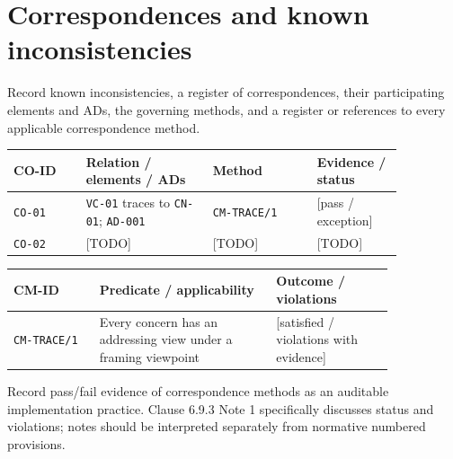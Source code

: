 \documentclass[11pt,letterpaper]{article}
\begin{document}
\section{Correspondences and known inconsistencies \texorpdfstring{}{(6.9)}}
\begin{Requirement}\FlagReq{} Record known inconsistencies, a register of correspondences, their participating elements and ADs, the governing methods, and a register or references to every applicable correspondence method. \end{Requirement}
\begin{longtable}{p{0.16\linewidth}p{0.28\linewidth}p{0.23\linewidth}p{0.19\linewidth}}\toprule
\textbf{CO-ID}&\textbf{Relation / elements / ADs}&\textbf{Method}&\textbf{Evidence / status}\\\midrule\endhead
\texttt{CO-01}&\texttt{VC-01} traces to \texttt{CN-01}; \texttt{AD-001}&\texttt{CM-TRACE/1}&[pass / exception]\\
\texttt{CO-02}&[TODO]&[TODO]&[TODO]\\\bottomrule\end{longtable}
\begin{longtable}{p{0.19\linewidth}p{0.39\linewidth}p{0.26\linewidth}}\toprule
\textbf{CM-ID}&\textbf{Predicate / applicability}&\textbf{Outcome / violations}\\\midrule\endhead
\texttt{CM-TRACE/1}&Every concern has an addressing view under a framing viewpoint&[satisfied / violations with evidence]\\\bottomrule\end{longtable}
\begin{Guidance}Record pass/fail evidence of correspondence methods as an auditable implementation practice. Clause 6.9.3 Note 1 specifically discusses status and violations; notes should be interpreted separately from normative numbered provisions.\end{Guidance}
\end{document}
